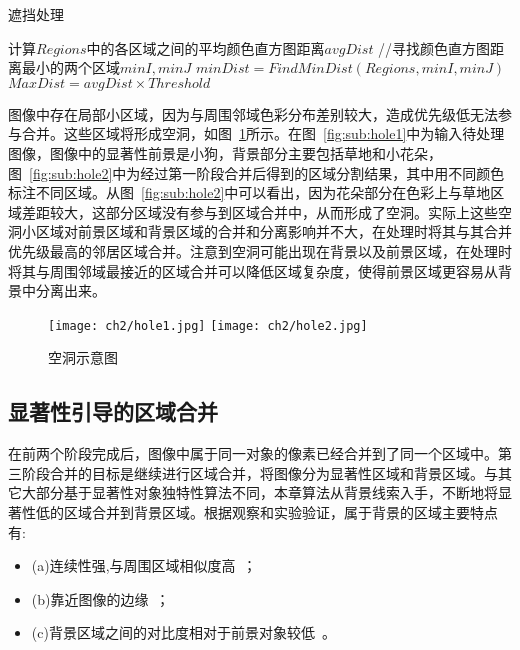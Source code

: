 \renewcommand{\algorithmcfname}{算法}
\begin{algorithm}[!htbp]
\caption{遮挡处理}
\label{alg:algMergeP2}
\LinesNumbered
{}
    计算$Regions$中的各区域之间的平均颜色直方图距离$avgDist$\;
    //寻找颜色直方图距离最小的两个区域$minI,minJ$\;
    $minDist = FindMinDist(Regions,minI,minJ)$\;
    $MaxDist = avgDist \times Threshold$\;



\end{algorithm}
\par

图像中存在局部小区域，因为与周围邻域色彩分布差别较大，造成优先级低无法参与合并。这些区域将形成空洞，如图~\ref{fig:hole}所示。在图~\ref{fig:sub:hole1}中为输入待处理图像，图像中的显著性前景是小狗，背景部分主要包括草地和小花朵，图~\ref{fig:sub:hole2}中为经过第一阶段合并后得到的区域分割结果，其中用不同颜色标注不同区域。从图~\ref{fig:sub:hole2}中可以看出，因为花朵部分在色彩上与草地区域差距较大，这部分区域没有参与到区域合并中，从而形成了空洞。实际上这些空洞小区域对前景区域和背景区域的合并和分离影响并不大，在处理时将其与其合并优先级最高的邻居区域合并。注意到空洞可能出现在背景以及前景区域，在处理时将其与周围邻域最接近的区域合并可以降低区域复杂度，使得前景区域更容易从背景中分离出来。
\begin{figure}[htb]
  \centering%
    {\texttt{[image: ch2/hole1.jpg]}}%
 \hspace{1em}%
      {\texttt{[image: ch2/hole2.jpg]}}

  \caption{空洞示意图}
  \label{fig:hole}
\end{figure}

\subsection{显著性引导的区域合并}
\label{subsec:mergeP3}

在前两个阶段完成后，图像中属于同一对象的像素已经合并到了同一个区域中。第三阶段合并的目标是继续进行区域合并，将图像分为显著性区域和背景区域。与其它大部分基于显著性对象独特性算法不同，本章算法从背景线索入手，不断地将显著性低的区域合并到背景区域。根据观察和实验验证，属于背景的区域主要特点有:
\begin{itemize}
\item (a)连续性强,与周围区域相似度高~\cite{geodesicDistance}；
\item (b)靠近图像的边缘~\cite{backgroundPrior}；
\item (c)背景区域之间的对比度相对于前景对象较低~\cite{geodesicDistance}。
\end{itemize}

